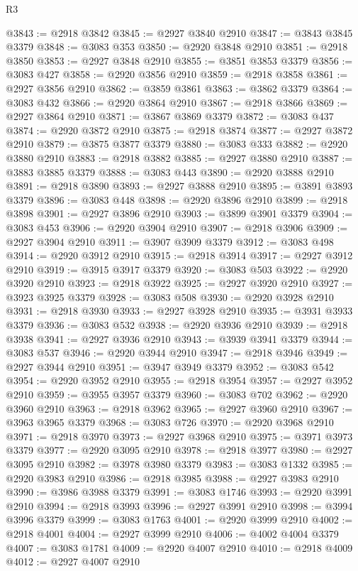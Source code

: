 \begin{lexlean}{R3}
\begin{coremodule}
@3843 := @2918 @3842
@3845 := @2927 @3840 @2910
@3847 := @3843 @3845 @3379
@3848 := @3083 @353
@3850 := @2920 @3848 @2910
@3851 := @2918 @3850
@3853 := @2927 @3848 @2910
@3855 := @3851 @3853 @3379
@3856 := @3083 @427
@3858 := @2920 @3856 @2910
@3859 := @2918 @3858
@3861 := @2927 @3856 @2910
@3862 := @3859 @3861
@3863 := @3862 @3379
@3864 := @3083 @432
@3866 := @2920 @3864 @2910
@3867 := @2918 @3866
@3869 := @2927 @3864 @2910
@3871 := @3867 @3869 @3379
@3872 := @3083 @437
@3874 := @2920 @3872 @2910
@3875 := @2918 @3874
@3877 := @2927 @3872 @2910
@3879 := @3875 @3877 @3379
@3880 := @3083 @333
@3882 := @2920 @3880 @2910
@3883 := @2918 @3882
@3885 := @2927 @3880 @2910
@3887 := @3883 @3885 @3379
@3888 := @3083 @443
@3890 := @2920 @3888 @2910
@3891 := @2918 @3890
@3893 := @2927 @3888 @2910
@3895 := @3891 @3893 @3379
@3896 := @3083 @448
@3898 := @2920 @3896 @2910
@3899 := @2918 @3898
@3901 := @2927 @3896 @2910
@3903 := @3899 @3901 @3379
@3904 := @3083 @453
@3906 := @2920 @3904 @2910
@3907 := @2918 @3906
@3909 := @2927 @3904 @2910
@3911 := @3907 @3909 @3379
@3912 := @3083 @498
@3914 := @2920 @3912 @2910
@3915 := @2918 @3914
@3917 := @2927 @3912 @2910
@3919 := @3915 @3917 @3379
@3920 := @3083 @503
@3922 := @2920 @3920 @2910
@3923 := @2918 @3922
@3925 := @2927 @3920 @2910
@3927 := @3923 @3925 @3379
@3928 := @3083 @508
@3930 := @2920 @3928 @2910
@3931 := @2918 @3930
@3933 := @2927 @3928 @2910
@3935 := @3931 @3933 @3379
@3936 := @3083 @532
@3938 := @2920 @3936 @2910
@3939 := @2918 @3938
@3941 := @2927 @3936 @2910
@3943 := @3939 @3941 @3379
@3944 := @3083 @537
@3946 := @2920 @3944 @2910
@3947 := @2918 @3946
@3949 := @2927 @3944 @2910
@3951 := @3947 @3949 @3379
@3952 := @3083 @542
@3954 := @2920 @3952 @2910
@3955 := @2918 @3954
@3957 := @2927 @3952 @2910
@3959 := @3955 @3957 @3379
@3960 := @3083 @702
@3962 := @2920 @3960 @2910
@3963 := @2918 @3962
@3965 := @2927 @3960 @2910
@3967 := @3963 @3965 @3379
@3968 := @3083 @726
@3970 := @2920 @3968 @2910
@3971 := @2918 @3970
@3973 := @2927 @3968 @2910
@3975 := @3971 @3973 @3379
@3977 := @2920 @3095 @2910
@3978 := @2918 @3977
@3980 := @2927 @3095 @2910
@3982 := @3978 @3980 @3379
@3983 := @3083 @1332
@3985 := @2920 @3983 @2910
@3986 := @2918 @3985
@3988 := @2927 @3983 @2910
@3990 := @3986 @3988 @3379
@3991 := @3083 @1746
@3993 := @2920 @3991 @2910
@3994 := @2918 @3993
@3996 := @2927 @3991 @2910
@3998 := @3994 @3996 @3379
@3999 := @3083 @1763
@4001 := @2920 @3999 @2910
@4002 := @2918 @4001
@4004 := @2927 @3999 @2910
@4006 := @4002 @4004 @3379
@4007 := @3083 @1781
@4009 := @2920 @4007 @2910
@4010 := @2918 @4009
@4012 := @2927 @4007 @2910

\end{coremodule}
\end{lexlean}

